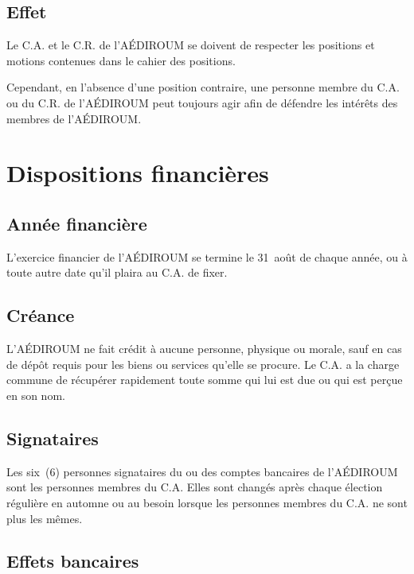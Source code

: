 \documentclass{aediroum}
\begin{document}
\subsection{Effet}\label{sec:effet-positions}

Le C.A. et le C.R. de l'AÉDIROUM se doivent de respecter les positions et motions contenues dans le cahier des positions.

Cependant, en l'absence d'une position contraire, une personne membre du C.A. ou du C.R. de l'AÉDIROUM peut toujours agir afin de défendre les intérêts des membres de l'AÉDIROUM.

\section{Dispositions financières}\label{sec:dispositions-financieres}
\subsection{Année financière}\label{sec:annee-financiere}

L'exercice financier de l'AÉDIROUM se termine le 31~août de chaque année, ou à toute autre date qu'il plaira au C.A. de fixer.

\subsection{Créance}\label{sec:creance}

L'AÉDIROUM ne fait crédit à aucune personne, physique ou morale, sauf en cas de dépôt requis pour les biens ou services qu'elle se procure. Le C.A. a la charge commune de récupérer rapidement toute somme qui lui est due ou qui est perçue en son nom.

\subsection{Signataires}\label{sec:signataires}
Les six~(6) personnes signataires du ou des comptes bancaires de l'AÉDIROUM sont les personnes membres du C.A. Elles sont changés après chaque élection régulière en automne ou au besoin lorsque les personnes membres du C.A. ne sont plus les mêmes.

\subsection{Effets bancaires}\label{sec:effets-bancaires}
\end{document}
